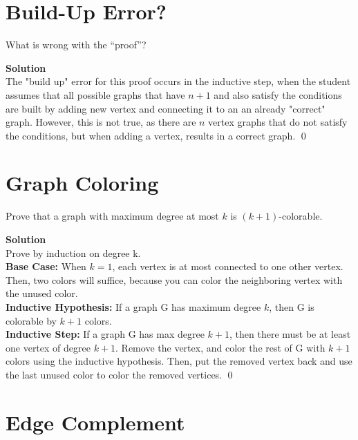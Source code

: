 \documentclass[11pt]{article}
\newcommand*{\Question}[1]{\section{#1}}
\begin{document}
\Question{Build-Up Error?}

What is wrong with the ``proof''?

\begin{mdframed} \textbf{Solution} \\
The "build up" error for this proof occurs in the inductive step, when the student assumes that all possible graphs that have $n+1$ and also satisfy the conditions are built by adding new vertex and connecting it to an an already "correct" graph. However, this is not true, as there are $n$ vertex graphs that do not satisfy the conditions, but when adding a vertex, results in a correct graph. \qed
\end{mdframed}

\Question{Graph Coloring}

Prove that a graph with maximum degree at most $k$ is $(k+1)$-colorable.

\begin{mdframed} \textbf{Solution} \\
Prove by induction on degree k.\\
\textbf{Base Case: }When $k=1$, each vertex is at most connected to one other vertex. Then, two colors will suffice, because you can color the neighboring vertex with the unused color. \\
\textbf{Inductive Hypothesis: }If a graph G has maximum degree $k$, then G is colorable by $k+1$ colors. \\
\textbf{Inductive Step: }If a graph G has max degree $k+1$, then there must be at least one vertex of degree $k+1$. Remove the vertex, and color the rest of G with $k+1$ colors using the inductive hypothesis. Then, put the removed vertex back and use the last unused color to color the removed vertices. \qed
\end{mdframed}

\Question{Edge Complement}
\end{document}
